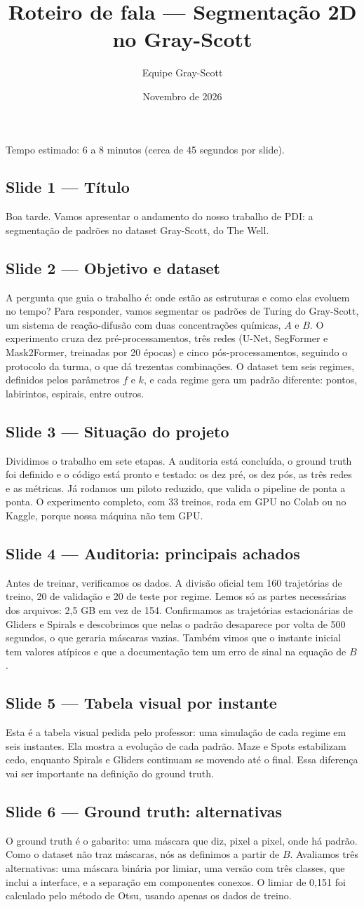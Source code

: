 \documentclass[11pt,a4paper]{article}
\title{Roteiro de fala --- Segmentação 2D no Gray-Scott}
\author{Equipe Gray-Scott}
\date{Novembro de 2026}
\newcommand{\slide}[2]{\subsection*{Slide #1 --- #2}}
\begin{document}
\maketitle

\noindent Tempo estimado: 6 a 8 minutos (cerca de 45 segundos por slide).

\slide{1}{Título}
Boa tarde. Vamos apresentar o andamento do nosso trabalho de PDI: a segmentação de padrões
no dataset Gray-Scott, do The Well.

\slide{2}{Objetivo e dataset}
A pergunta que guia o trabalho é: onde estão as estruturas e como elas evoluem no tempo?
Para responder, vamos segmentar os padrões de Turing do Gray-Scott, um sistema de
reação-difusão com duas concentrações químicas, $A$ e $B$. O experimento cruza dez
pré-processamentos, três redes (U-Net, SegFormer e Mask2Former, treinadas por 20 épocas) e cinco pós-processamentos, seguindo o protocolo da turma,
o que dá trezentas combinações. O dataset tem seis regimes, definidos pelos parâmetros $f$ e $k$,
e cada regime gera um padrão diferente: pontos, labirintos, espirais, entre outros.

\slide{3}{Situação do projeto}
Dividimos o trabalho em sete etapas. A auditoria está concluída, o ground truth foi definido
e o código está pronto e testado: os dez pré, os dez pós, as três redes e as métricas. Já
rodamos um piloto reduzido, que valida o pipeline de ponta a ponta. O experimento completo,
com 33 treinos, roda em GPU no Colab ou no Kaggle, porque nossa máquina não tem GPU.

\slide{4}{Auditoria: principais achados}
Antes de treinar, verificamos os dados. A divisão oficial tem 160 trajetórias de treino,
20 de validação e 20 de teste por regime. Lemos só as partes necessárias dos arquivos:
2,5 GB em vez de 154. Confirmamos as trajetórias estacionárias de Gliders e Spirals e
descobrimos que nelas o padrão desaparece por volta de 500 segundos, o que geraria máscaras
vazias. Também vimos que o instante inicial tem valores atípicos e que a documentação tem
um erro de sinal na equação de $B$.

\slide{5}{Tabela visual por instante}
Esta é a tabela visual pedida pelo professor: uma simulação de cada regime em seis instantes.
Ela mostra a evolução de cada padrão. Maze e Spots estabilizam cedo, enquanto Spirals e
Gliders continuam se movendo até o final. Essa diferença vai ser importante na definição do
ground truth.

\slide{6}{Ground truth: alternativas}
O ground truth é o gabarito: uma máscara que diz, pixel a pixel, onde há padrão. Como o
dataset não traz máscaras, nós as definimos a partir de $B$. Avaliamos três alternativas:
uma máscara binária por limiar, uma versão com três classes, que inclui a interface, e a
separação em componentes conexos. O limiar de 0,151 foi calculado pelo método de Otsu,
usando apenas os dados de treino.
\end{document}
